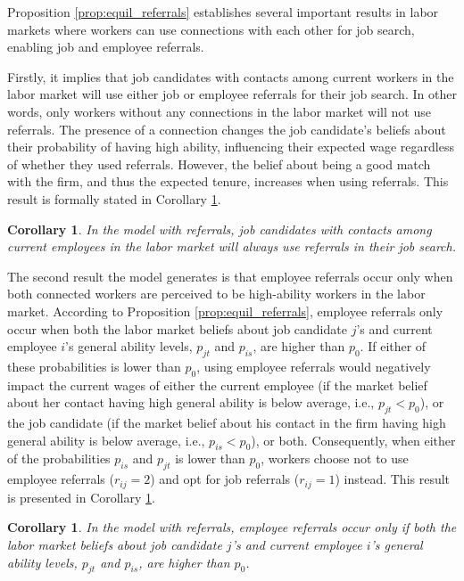 \documentclass[12pt]{article}
\newtheorem{corollary}[theorem]{Corollary}
\begin{document}
Proposition \ref{prop:equil_referrals} establishes several important results in labor markets where workers can use connections with each other for job search, enabling job and employee referrals.

Firstly, it implies that job candidates with contacts among current workers in the labor market will use either job or employee referrals for their job search. In other words, only workers without any connections in the labor market will not use referrals. The presence of a connection changes the job candidate's beliefs about their probability of having high ability, influencing their expected wage regardless of whether they used referrals. However, the belief about being a good match with the firm, and thus the expected tenure, increases when using referrals. This result is formally stated in Corollary \ref{cor:job_referrals_existence}.

\begin{corollary}\label{cor:job_referrals_existence}
In the model with referrals, job candidates with contacts among current employees in the labor market will always use referrals in their job search.
\end{corollary}

The second result the model generates is that employee referrals occur only when both connected workers are perceived to be high-ability workers in the labor market. According to Proposition \ref{prop:equil_referrals}, employee referrals only occur when both the labor market beliefs about job candidate $j$'s and current employee $i$'s general ability levels, $p_{jt}$ and $p_{is}$, are higher than $p_0$. If either of these probabilities is lower than $p_0$, using employee referrals would negatively impact the current wages of either the current employee (if the market belief about her contact having high general ability is below average, i.e., $p_{jt} < p_0$), or the job candidate (if the market belief about his contact in the firm having high general ability is below average, i.e., $p_{is} < p_0$), or both. Consequently, when either of the probabilities $p_{is}$ and $p_{jt}$ is lower than $p_0$, workers choose not to use employee referrals ($r_{ij}=2$) and opt for job referrals ($r_{ij}=1$) instead. This result is presented in Corollary \ref{cor:employee_referrals_existence}.

\begin{corollary}\label{cor:employee_referrals_existence}
In the model with referrals, employee referrals occur only if both the labor market beliefs about job candidate $j$'s and current employee $i$'s general ability levels, $p_{jt}$ and $p_{is}$, are higher than $p_0$.
\end{corollary}
\end{document}

